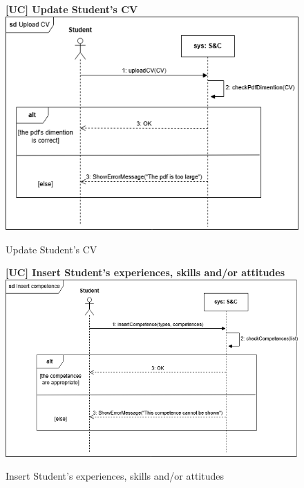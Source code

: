 \begin{figure}[H]
\textbf{[UC\nextUCDiagr] Update Student's CV}\newline\newline
\includegraphics[width=15cm]{Images/UC_diagram/RASD-UC5.drawio.png}
    \caption{Update Student's CV}
\end{figure}

\begin{figure}[H]
\textbf{[UC\nextUCDiagr] Insert Student’s experiences, skills and/or attitudes}\newline\newline
\includegraphics[width=15cm]{Images/UC_diagram/RASD-UC6.drawio.png}
    \caption{Insert Student’s experiences, skills and/or attitudes}
\end{figure}

